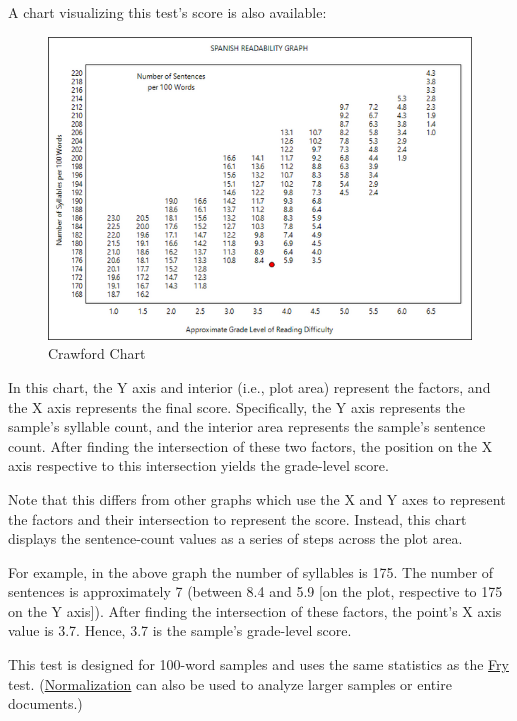 \documentclass[
]{book}
\theoremstyle{definition}
\theoremstyle{definition}
\theoremstyle{definition}
\theoremstyle{definition}
\theoremstyle{remark}
\begin{document}
A chart visualizing this test's score is also available:

\begin{figure}[H]

{\centering \includegraphics[width=0.75\linewidth,]{Images/CrawfordGraph} 

}

\caption{Crawford Chart}\label{fig:crawfordgraph}
\end{figure}

In this chart, the Y axis and interior (i.e., plot area) represent the factors, and the X axis represents the final score. Specifically, the Y axis represents the sample's syllable count, and the interior area represents the sample's sentence count. After finding the intersection of these two factors, the position on the X axis respective to this intersection yields the grade-level score.

Note that this differs from other graphs which use the X and Y axes to represent the factors and their intersection to represent the score. Instead, this chart displays the sentence-count values as a series of steps across the plot area.

For example, in the above graph the number of syllables is 175. The number of sentences is approximately 7 (between 8.4 and 5.9 {[}on the plot, respective to 175 on the Y axis{]}). After finding the intersection of these factors, the point's X axis value is 3.7. Hence, 3.7 is the sample's grade-level score.

This test is designed for 100-word samples and uses the same statistics as the \protect\hyperlink{fry-test}{Fry} test. (\protect\hyperlink{glossary}{Normalization} can also be used to analyze larger samples or entire documents.)

\newpage
\end{document}
